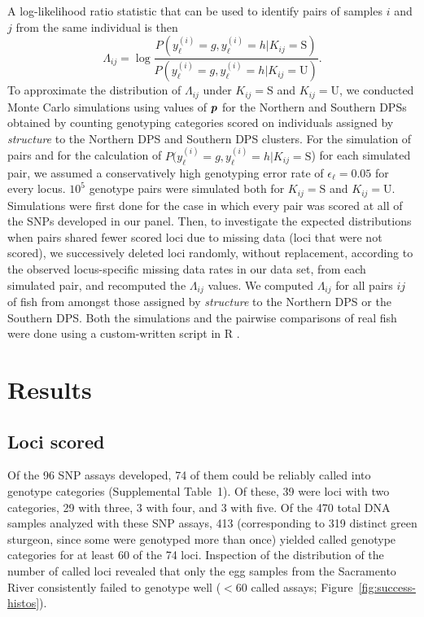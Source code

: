 A log-likelihood ratio statistic that can be used to
identify pairs of samples $i$ and $j$ from the same
individual is then
\begin{equation}
\Lambda_{ij}= \log\frac{P(y^{(i)}_\ell = g, y^{(i)}_\ell = h | K_{ij} = \mathrm{S})}
{P(y^{(i)}_\ell = g, y^{(i)}_\ell = h | K_{ij} = \mathrm{U})}.
\label{eq:logl}
\end{equation}
To approximate the distribution of
$\Lambda_{ij}$ under $K_{ij} = \mathrm{S}$ and $K_{ij} = \mathrm{U}$, we
conducted Monte Carlo simulations using values of $\bp$ for the Northern and Southern DPSs obtained
by counting genotyping categories scored on individuals assigned by {\em structure} to
the Northern DPS and Southern DPS
clusters.  For the simulation of pairs and for the calculation
of $P(y^{(i)}_\ell = g, y^{(i)}_\ell = h | K_{ij} = \mathrm{S}$) 
for each simulated pair, we assumed a conservatively high genotyping error rate of
$\epsilon_\ell = 0.05$ for every locus.  
$10^5$ genotype pairs were simulated both for $K_{ij} = \mathrm{S}$ and $K_{ij} = \mathrm{U}$.
Simulations were first done for 
the case in which every pair was scored at all of the SNPs developed in our
panel. Then, to investigate the expected
distributions when pairs shared fewer scored loci due to missing data (\ie loci that were not scored),
we successively deleted loci randomly, without replacement, according to 
the observed locus-specific missing
data rates in our data set, from each simulated pair, and recomputed the $\Lambda_{ij}$ values.
We computed $\Lambda_{ij}$ for all pairs
$ij$ of fish from amongst those assigned by {\em structure} to the
Northern DPS or the Southern DPS\@. Both the
simulations and the pairwise comparisons of real fish were done using a custom-written
script in R \citep{RCore2015}.

\section{Results}

\subsection{Loci scored}

Of the 96 SNP assays developed, 74 of them could be reliably called into
genotype categories (Supplemental Table~1).  Of these, 39 were loci with two 
categories, 29 with
three, 3 with four, and 3 with five. Of the 470 total DNA samples analyzed with
these SNP assays, 413 (corresponding to 319 distinct green sturgeon, since some
were genotyped more than once) yielded called genotype categories for at least 60
of the 74 loci. Inspection of the distribution of the number of called loci
revealed that only the egg samples from the Sacramento River consistently failed
to genotype well ($<$60 called assays; Figure~\ref{fig:success-histos}).

